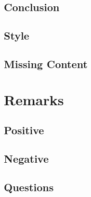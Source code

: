 \subsection{Conclusion} \label{sub:conclusion}


\subsection{Style} \label{sub:style}


\subsection{Missing Content} \label{sub:content}



\section{Remarks} \label{sec:remarks}


\subsection{Positive} \label{sub:positive}


\subsection{Negative} \label{sub:negative}


\subsection{Questions} \label{sub:questions2}



